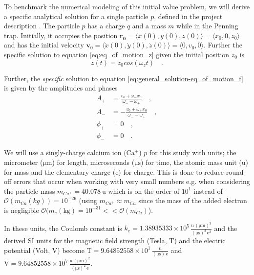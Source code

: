 \documentclass[../main_proj3.tex]{subfiles}
\begin{document}
To benchmark the numerical modeling of this initial value problem, we will derive a specific analytical solution for a single particle $p$, defined in the project description \cite{prosjekttbeskrivelse3}. The particle $p$ has a charge $q$ and a mass $m$ while in the Penning trap. Initially, it occupies the position
$\mathbf{r_0} = \bigl\langle x(0), y(0), z(0) \bigr\rangle = \bigl\langle x_0, 0, z_0 \rangle$ and has the initial velocity $\mathbf{v}_0 = \bigl\langle 
\dot{x}(0), \dot{y}(0), \dot{z}(0)
\bigr\rangle = \bigl\langle 
0, v_0, 0 \bigr\rangle$. Further the specific solution to equation \eqref{eq:eq_of_motion_z} given the initial position $z_0$ is 
\begin{equation}
\label{eq:specific_solution-eq_of_motion_z}
z(t) = z_0 cos(\omega_z t) \quad.
\end{equation}

Further, the \textit{specific} solution to equation \eqref{eq:general_solution-eq_of_motion_f} is given by the amplitudes and phases 
\begin{equation*}
\begin{split}
    A_+ & = \frac{v_0 + \omega_-x_0}{\omega_- - \omega_+} \quad ,\\
    A_- & = - \frac{v_0 + \omega_+ x_0}{\omega_- - \omega_+} \quad , \\
    \phi_+ &= 0\quad , \\
    \phi_- & = 0    \quad.
\end{split}
\end{equation*}

We will use a singly-charge calcium ion (Ca$^{+}$) $p$ for this study with units; the micrometer ($\mathrm{\mu m}$) for length, microseconds ($\mathrm{\mu s}$) for time, the atomic mass unit ($\mathrm{u}$) for mass and the  elementary charge ($\mathrm{e}$) for charge.  This is done to reduce round-off errors that occur when working with very small numbers e.g. when considering the particle mass $m_{Ca^{+}} = 40.078 ~\mathrm{u}$ which is on the order of $10^{1}$ instead of $\mathcal{O}(m_{Ca} (kg)) = 10^{-26}$ (using $m_{Ca^{+}}\approx m_{Ca}$ since the mass of the added electron is negligible $\mathcal{O}(m_{e}(\text{kg}) = 10^{-31} << \mathcal{O}(m_{Ca})$).

In these units, the Coulomb constant is $k_e = 1.38935333 \times 10^5 \, \frac{\mathrm{u} \, (\mathrm{\mu m})^3}{(\mathrm{\mu s})^2 \, \mathrm{e}^2}$ and the derived SI units for the magnetic field strength (Tesla, $\mathrm{T}$) and the electric potential (Volt, $\mathrm{V}$) become $\mathrm{T} = 9.64852558 \times 10^1 \, \frac{\mathrm{u}}{(\mathrm{\mu s}) \, \mathrm{e}}$ and $\mathrm{V} = 9.64852558 \times 10^7 \, \frac{\mathrm{u} \, (\mathrm{\mu m})^2}{(\mathrm{\mu s})^2 \, \mathrm{e}}$.
\end{document}
